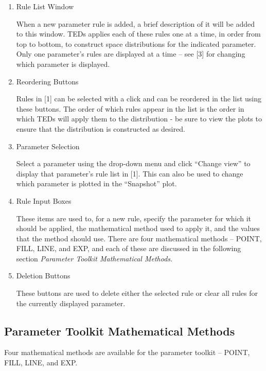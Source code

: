 \documentclass[11pt,letterpaper,titlepage]{article}
\begin{document}
			\begin{enumerate}
				\item Rule List Window
				\par When a new parameter rule is added, a brief description of it will be added to this window. TEDs applies each of these rules one at a time, in order from top to bottom, to construct space distributions for the indicated parameter. Only one parameter’s rules are displayed at a time – see [3] for changing which parameter is displayed.
				
				\item Reordering Buttons
				\par Rules in [1] can be selected with a click and can be reordered in the list using these buttons. The order of which rules appear in the list is the order in which TEDs will apply them to the distribution - be sure to view the plots to ensure that the distribution is constructed as desired.
				
				\item Parameter Selection
				\par Select a parameter using the drop-down menu and click “Change view” to display that parameter’s rule list in [1]. This can also be used to change which parameter is plotted in the “Snapshot” plot.
				
				\item Rule Input Boxes
				\par These items are used to, for a new rule, specify the parameter for which it should be applied, the mathematical method used to apply it, and the values that the method should use. There are four mathematical methods – POINT, FILL, LINE, and EXP, and each of these are discussed in the following section \textit{Parameter Toolkit Mathematical Methods.}
				
				\item Deletion Buttons
				\par These buttons are used to delete either the selected rule or clear all rules for the currently displayed parameter.
			\end{enumerate}
		
		\subsection{Parameter Toolkit Mathematical Methods}
		\par Four mathematical methods are available for the parameter toolkit – POINT, FILL, LINE, and EXP.
		
\end{document}
